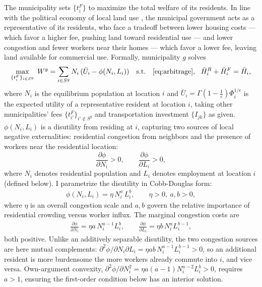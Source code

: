 \documentclass[12pt, a4paper]{article}
\theoremstyle{definition}
\begin{document}
The municipality sets $\{t_i^F\}$ to maximize the total welfare of its residents. In line with the political economy of local land use \citep{Mast2024-zi, Rollet2025-mk}, the municipal government acts as a representative of its residents, who face a tradeoff between lower housing costs — which favor a higher fee, pushing land toward residential use — and lower congestion and fewer workers near their homes — which favor a lower fee, leaving land available for commercial use. Formally, municipality $g$ solves
\[
\max_{\{t_i^F\}_{i \in S^g}}\; W^g = \sum_{i \in S^g} N_i\,(\bar{U}_i-\phi(N_i, L_i))
\quad\text{s.t.}\quad
\eqref{eq:arbitrage},\ \ \bar{H}_i^R + \bar{H}_i^F = \bar{H}_i,
\]
where $N_i$ is the equilibrium population at location $i$ and $\bar{U}_i = \Gamma\!\left(1-\frac{1}{\epsilon}\right)\Phi_i^{1/\epsilon}$ is the expected utility of a representative resident at location $i$, taking other municipalities' fees $\{t_{i'}^F\}_{i' \notin S^g}$ and transportation investment $\{I_{jk}\}$ as given. $\phi(N_i, L_i)$ is a disutility from residing at $i$, capturing two sources of local negative externalities: residential congestion from neighbors and the presence of workers near the residential location:
\[
\frac{\partial \phi}{\partial N_i} > 0, \qquad \frac{\partial \phi}{\partial L_i} > 0,
\]
where $N_i$ denotes residential population and $L_i$ denotes employment at location $i$ (defined below). I parametrize the disutility in Cobb-Douglas form:
\begin{align}
    \phi(N_i, L_i) = \eta\, N_i^{a}\, L_i^{b}, \qquad \eta > 0,\ a, b > 0,
\end{align}
where $\eta$ is an overall congestion scale and $a, b$ govern the relative importance of residential crowding versus worker influx. The marginal congestion costs are
\begin{align}
    \label{eq:phi-partials}
\frac{\partial \phi}{\partial N_i} = \eta a\, N_i^{a-1} L_i^{b}, \qquad
\frac{\partial \phi}{\partial L_i} = \eta b\, N_i^{a} L_i^{b-1},
\end{align}
both positive. Unlike an additively separable disutility, the two congestion sources are here mutual complements: $\partial^2\phi/\partial N_i\partial L_i = \eta a b\, N_i^{a-1}L_i^{b-1} > 0$, so an additional resident is more burdensome the more workers already commute into $i$, and vice versa. Own-argument convexity, $\partial^2\phi/\partial N_i^2 = \eta a(a-1)N_i^{a-2}L_i^b > 0$, requires $a>1$, ensuring the first-order condition below has an interior solution.
\end{document}
